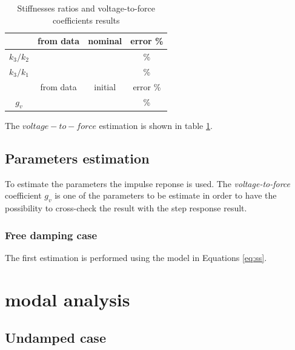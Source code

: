 \documentclass[twosided,a4paper]{article}           %
\begin{document}
\begin{table}[H]
	\centering
	\begin{tabular}{|c|c|c|c|}
		\hline 
		 & from data & nominal & error \% \\ 
		\hline 
		$k_3/k_2$ & &  & \%  \\ 
		\hline 
		$k_3/k_1$ & &  & \% \\
		\hline \hline
		      & from data              & initial & error 
		      \%\\
		\hline
		$g_v$ &  &  & \% \\\hline
	\end{tabular} 
	\label{tab:ratios}
	\caption{Stiffnesses ratios and voltage-to-force coefficients results}
\end{table}
The $voltage-to-force$ estimation is shown in table \ref{tab:ratios}.
\subsection{Parameters estimation}
To estimate the parameters the impulse reponse is used. The \textit{voltage-to-force} coefficient $g_v$ is one of the parameters to be estimate in order to have the possibility to cross-check the result with the step response result.
\subsubsection{Free damping case}
The first estimation is performed using the model in Equations \ref{eq:ss}.
\section{modal analysis}
\subsection{Undamped case}
\end{document}
